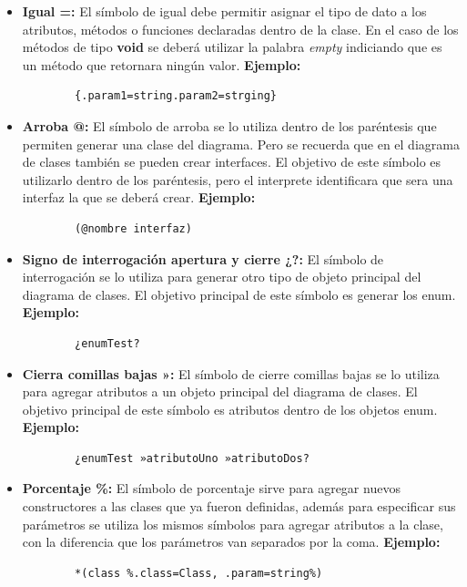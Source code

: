 \begin{itemize}
	\item \textbf{Igual =:} El símbolo de igual debe permitir asignar el tipo de dato a los atributos, métodos o funciones declaradas dentro de la clase. En el caso de los métodos de tipo \textbf{void}  se deberá utilizar la palabra \textit{empty} indiciando que es un método que retornara ningún valor. \textbf{Ejemplo:}
	
	\begin{verbatim}
		{.param1=string.param2=strging}
	\end{verbatim}
	
	\item \textbf{Arroba @:} El símbolo de arroba se lo utiliza dentro de los paréntesis que permiten generar una clase del diagrama. Pero se recuerda que en el diagrama de clases también se pueden crear interfaces. El objetivo de este símbolo es utilizarlo dentro de los paréntesis, pero el interprete identificara que sera una interfaz la que se deberá crear. \textbf{Ejemplo:}
	  
	\begin{verbatim}
		(@nombre interfaz)
	\end{verbatim}

	\item  \textbf{Signo de interrogación apertura y cierre ¿?:} El símbolo de interrogación se lo utiliza para generar otro tipo de objeto principal del diagrama de clases. El objetivo principal de este símbolo es generar los enum. \textbf{Ejemplo:}
	
	\begin{verbatim}
		¿enumTest?
	\end{verbatim}

	\item \textbf{Cierra comillas bajas »:} El símbolo  de cierre comillas bajas se lo utiliza para agregar atributos a un objeto principal del diagrama de clases. El objetivo principal de este símbolo es atributos dentro de los objetos enum. \textbf{Ejemplo:}
	
	\begin{verbatim}
		¿enumTest »atributoUno »atributoDos?
	\end{verbatim}

	\item \textbf{Porcentaje \%:} El símbolo de porcentaje sirve para agregar nuevos constructores a las clases que ya fueron definidas, además para especificar sus parámetros se utiliza los mismos símbolos para agregar atributos a la clase, con la diferencia que los parámetros van separados por la coma. \textbf{Ejemplo:}
	
	\begin{verbatim}
		*(class %.class=Class, .param=string%)
	\end{verbatim}
	  
\end{itemize}


